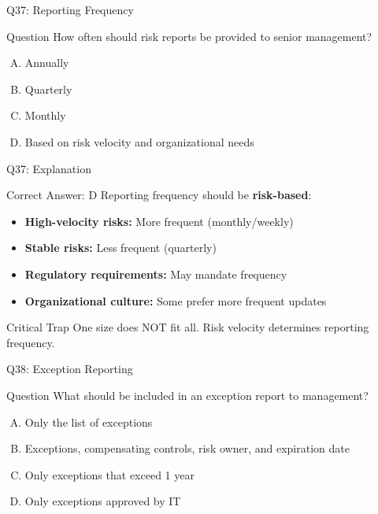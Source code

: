 \documentclass{beamer}
\begin{document}
	\begin{frame}{Q37: Reporting Frequency}
		\begin{block}{Question}
			How often should risk reports be provided to senior management?
		\end{block}
		\begin{enumerate}[(A)]
			\item Annually
			\item Quarterly
			\item Monthly
			\item Based on risk velocity and organizational needs
		\end{enumerate}
	\end{frame}
	
	\begin{frame}{Q37: Explanation}
		\begin{block}{Correct Answer: D}
			Reporting frequency should be \textbf{risk-based}:
			\begin{itemize}
				\item \textbf{High-velocity risks:} More frequent (monthly/weekly)
				\item \textbf{Stable risks:} Less frequent (quarterly)
				\item \textbf{Regulatory requirements:} May mandate frequency
				\item \textbf{Organizational culture:} Some prefer more frequent updates
			\end{itemize}
		\end{block}
		\begin{alertblock}{Critical Trap}
			One size does NOT fit all.
			Risk velocity determines reporting frequency.
		\end{alertblock}
	\end{frame}
	
	\begin{frame}{Q38: Exception Reporting}
		\begin{block}{Question}
			What should be included in an exception report to management?
		\end{block}
		\begin{enumerate}[(A)]
			\item Only the list of exceptions
			\item Exceptions, compensating controls, risk owner, and expiration date
			\item Only exceptions that exceed 1 year
			\item Only exceptions approved by IT
		\end{enumerate}
	\end{frame}
	
\end{document}
